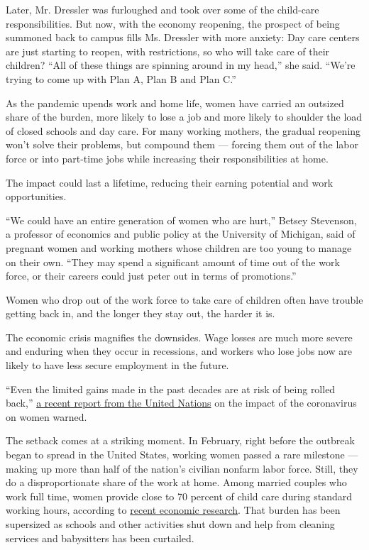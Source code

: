 Later, Mr. Dressler was furloughed and took over some of the child-care
responsibilities. But now, with the economy reopening, the prospect of
being summoned back to campus fills Ms. Dressler with more anxiety: Day
care centers are just starting to reopen, with restrictions, so who will
take care of their children? ``All of these things are spinning around
in my head,'' she said. ``We're trying to come up with Plan A, Plan B
and Plan C.''

As the pandemic upends work and home life, women have carried an
outsized share of the burden, more likely to lose a job and more likely
to shoulder the load of closed schools and day care. For many working
mothers, the gradual reopening won't solve their problems, but compound
them --- forcing them out of the labor force or into part-time jobs
while increasing their responsibilities at home.

The impact could last a lifetime, reducing their earning potential and
work opportunities.

``We could have an entire generation of women who are hurt,'' Betsey
Stevenson, a professor of economics and public policy at the University
of Michigan, said of pregnant women and working mothers whose children
are too young to manage on their own. ``They may spend a significant
amount of time out of the work force, or their careers could just peter
out in terms of promotions.''

Women who drop out of the work force to take care of children often have
trouble getting back in, and the longer they stay out, the harder it is.

The economic crisis magnifies the downsides. Wage losses are much more
severe and enduring when they occur in recessions, and workers who lose
jobs now are likely to have less secure employment in the future.

``Even the limited gains made in the past decades are at risk of being
rolled back,''
\href{https://www.unfpa.org/sites/default/files/resource-pdf/COVID-19_A_Gender_Lens_Guidance_Note.pdf}{a
recent report from the United Nations} on the impact of the coronavirus
on women warned.

The setback comes at a striking moment. In February, right before the
outbreak began to spread in the United States, working women passed a
rare milestone --- making up more than half of the nation's civilian
nonfarm labor force. Still, they do a disproportionate share of the work
at home. Among married couples who work full time, women provide close
to 70 percent of child care during standard working hours, according to
\href{http://faculty.wcas.northwestern.edu/~mdo738/research/Alon_Doepke_Olmstead-Rumsey_Tertilt_COVID_2020.pdf}{recent
economic research}. That burden has been supersized as schools and other
activities shut down and help from cleaning services and babysitters has
been curtailed.

